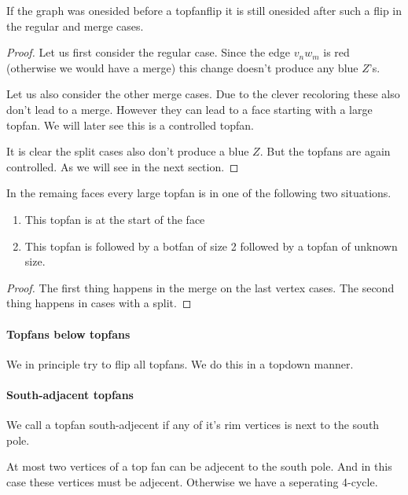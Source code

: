 \begin{lemma}
  \label{lm:}
  If the graph was onesided before a topfanflip it is still onesided after such a flip in the regular and merge cases.
\end{lemma}
\begin{proof}
  Let us first consider the regular case. Since the edge  $v_n w_m$ is red (otherwise we would have a merge) this change doesn't produce any blue $Z$'s.

  Let us also consider the other merge cases. Due to the   clever recoloring these also don't lead to a merge. However they can lead to a face starting with a large topfan. We will later see this is a controlled topfan.

  It is clear the split cases also don't produce a blue $Z$. But the topfans are again controlled. As we will see in the next section.
\end{proof}


\begin{lemma}
  \label{lm:}
  In the remaing faces every large topfan is in one of the following two situations.
  \begin{enumerate}
    \item  This topfan is at the start of the face
    \item  This topfan is followed by a botfan of size 2 followed by a topfan of unknown size.
  \end{enumerate}
\end{lemma}
\begin{proof}
  The first thing happens in the merge on the last vertex cases. The second thing happens in cases with a split.
\end{proof}


\paragraph{Topfans below topfans}
We in principle try to flip all topfans. We do this in a topdown manner.


\paragraph{South-adjacent topfans}
We call a topfan south-adjecent if any of it's rim vertices is next to the south pole.

At most two vertices of a top fan can be adjecent to the south pole. And in this case these vertices must be adjecent. Otherwise we have a seperating 4-cycle.

